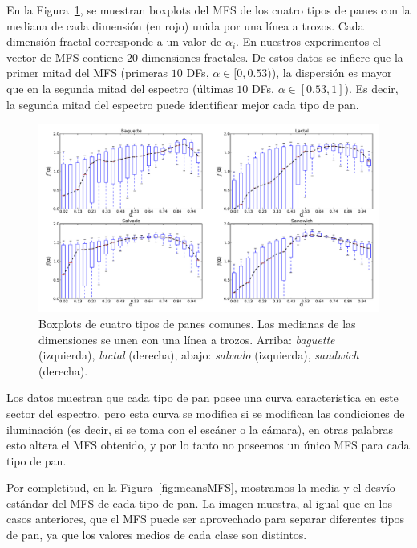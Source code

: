 En la Figura~\ref{fig:boxplotsMFS}, se muestran boxplots del MFS de los cuatro tipos de panes con la mediana de cada dimensión (en rojo) unida por una línea a trozos. Cada dimensión fractal corresponde a un valor de $\alpha_{i}$. En nuestros experimentos el vector de MFS contiene $20$ dimensiones fractales. De estos datos se infiere que la primer mitad del MFS (primeras $10$ DFs, $\alpha \in [0,0.53)$), la dispersión es mayor que en la segunda mitad del espectro  (últimas $10$ DFs, $\alpha \in [0.53,1]$). Es decir, la segunda mitad del espectro puede identificar mejor cada tipo de pan.


\begin{figure}[h!]
\centering
\includegraphics[width=13cm]{boxplots}
\caption[Boxplots de distintos tipos de panes]{Boxplots de cuatro tipos de panes comunes. Las medianas de las dimensiones se unen con una línea a trozos. Arriba: {\em baguette} (izquierda), {\em lactal} (derecha), abajo: {\em salvado} (izquierda), {\em sandwich} (derecha).}
\label{fig:boxplotsMFS}
\end{figure}


Los datos muestran que cada tipo de pan posee una curva característica en este sector del espectro, pero esta curva se modifica si se modifican las condiciones de iluminación (es decir, si se toma con el escáner o la cámara), en otras palabras esto altera el MFS obtenido, y por lo tanto no poseemos un único MFS para cada tipo de pan. 

Por completitud, en la Figura~\ref{fig:meansMFS}, mostramos la media y el desvío estándar del MFS de cada tipo de pan.
La imagen muestra, al igual que en los casos anteriores, que el MFS puede ser aprovechado para separar diferentes tipos de pan, ya que los valores medios de cada clase son distintos.



